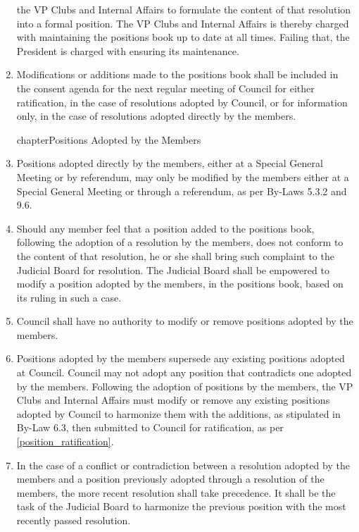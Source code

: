 \documentclass[oneside]{book}
\begin{document}
\begin{enumerate}
the VP Clubs and Internal Affairs to formulate the content of that resolution into a formal position. 
The VP Clubs and Internal Affairs is thereby charged with maintaining the
positions book up to date at all times. Failing that, the President is charged with ensuring its maintenance.
\item\label{position_ratification} Modifications or additions made to the positions book shall be included in the consent agenda 
for the next regular meeting of Council for either ratification, in the case of resolutions adopted 
by Council, or for information only, in the case of resolutions adopted directly by the members.

chapter{\label{POSITIONS_ADOPTED_BY_MEMBERS}Positions Adopted by the Members}

\item Positions adopted directly by the members, either at a Special General Meeting 
or by referendum, may only be modified by the members either at a Special General Meeting 
or through a referendum, as per By-Laws 5.3.2 and 9.6.
\item Should any member feel that a position added to the positions book, following the 
adoption of a resolution by the members, does not conform to the content of that resolution, 
he or she shall bring such complaint to the Judicial Board for resolution. The Judicial 
Board shall be empowered to modify a position adopted by the members, in the positions book, 
based on its ruling in such a case.
\item Council shall have no authority to modify or remove positions adopted by the members.
\item Positions adopted by the members supersede any existing positions adopted at Council. 
Council may not adopt any position that contradicts one adopted by the members. Following 
the adoption of positions by the members, the VP Clubs and Internal Affairs must modify or 
remove any existing positions adopted by Council to harmonize them with the additions, as 
stipulated in By-Law 6.3, then submitted to Council for ratification, as per \ref{position_ratification}.
\item In the case of a conflict or contradiction between a resolution adopted by the members 
and a position previously adopted through a resolution of the members, the more recent 
resolution shall take precedence. It shall be the task of the Judicial Board to harmonize 
the previous position with the most recently passed resolution.


\end{enumerate}
\end{document}
